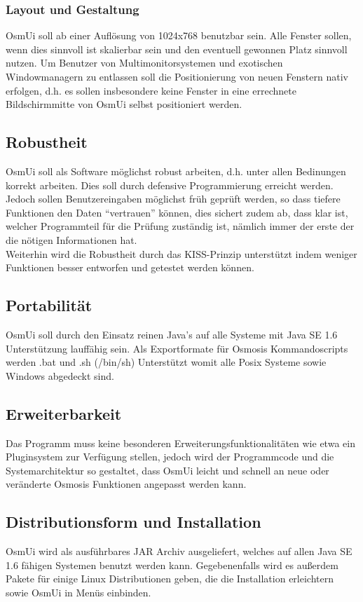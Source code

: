 \documentclass[a4paper,10pt]{scrartcl}
\begin{document}
\subsubsection{Layout und Gestaltung}
OsmUi soll ab einer Auflösung von 1024x768 benutzbar sein. Alle Fenster sollen, wenn dies sinnvoll ist skalierbar sein und den eventuell gewonnen Platz sinnvoll
nutzen. Um Benutzer von Multimonitorsystemen und exotischen Windowmanagern zu entlassen soll die Positionierung von neuen Fenstern nativ erfolgen, d.h. es
sollen insbesondere keine Fenster in eine errechnete Bildschirmmitte von OsmUi selbst positioniert werden.
\subsection{Robustheit}
OsmUi soll als Software möglichst robust arbeiten, d.h. unter allen Bedinungen korrekt arbeiten. Dies soll durch defensive Programmierung erreicht werden.
Jedoch sollen Benutzereingaben möglichst früh geprüft werden, so dass tiefere Funktionen den Daten ``vertrauen'' können, dies sichert zudem ab, dass klar ist, welcher
Programmteil für die Prüfung zuständig ist, nämlich immer der erste der die nötigen Informationen hat.\\
Weiterhin wird die Robustheit durch das KISS-Prinzip unterstützt indem weniger Funktionen besser entworfen und getestet werden können.
\subsection{Portabilität}
OsmUi soll durch den Einsatz reinen Java's auf alle Systeme mit Java SE 1.6 Unterstützung lauffähig sein. Als Exportformate für Osmosis Kommandoscripts
werden .bat und .sh (/bin/sh) Unterstützt womit alle Posix Systeme sowie Windows abgedeckt sind.
\subsection{Erweiterbarkeit}
Das Programm muss keine besonderen Erweiterungsfunktionalitäten wie etwa ein Pluginsystem zur Verfügung stellen, jedoch wird der Programmcode und die Systemarchitektur
so gestaltet, dass OsmUi leicht und schnell an neue oder veränderte Osmosis Funktionen angepasst werden kann.
\subsection{Distributionsform und Installation}
OsmUi wird als ausführbares JAR Archiv ausgeliefert, welches auf allen Java SE 1.6 fähigen Systemen benutzt werden kann. Gegebenenfalls wird es außerdem Pakete 
für einige Linux Distributionen geben, die die Installation erleichtern sowie OsmUi in Menüs einbinden.
\end{document}
